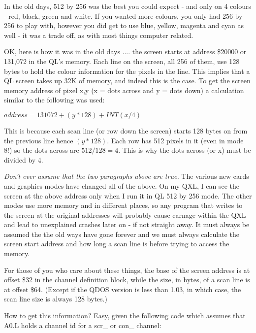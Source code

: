 In the old days, 512 by 256 was the best you could expect -{} and only
    on 4 colours -{} red, black, green and white. If you wanted more colours,
    you only had 256 by 256 to play with, however you did get to use blue,
    yellow, magenta and cyan as well -{} it was a trade off, as with most things
    computer related.

OK, here is how it was in the old days .... the screen starts at
    address \$20000 or 131,072 in the QL's memory. Each line on the screen, all
    256 of them, use 128 bytes to hold the colour information for the pixels
    in the line. This implies that a QL screen takes up 32K of memory, and
    indeed this is the case. To get the screen memory address of pixel x,y (x
    = dots across and y = dots down) a calculation similar to the following
    was used:

$address = 131072 + (y * 128) + INT(x / 4)$

This is because each scan line (or row down the screen) starts 128
    bytes on from the previous line hence $(y * 128)$. Each row has 512 pixels
    in it (even in mode 8!) so the dots across are $512/128 = 4$. This is why
    the dots across (or x) must be divided by 4.

\begin{warning}
\emph{Don't ever assume that the two paragraphs above are
      true.} The various new cards and graphics modes have changed
      all of the above. On my QXL, I can see the screen at the above address
      only when I run it in QL 512 by 256 mode. The other modes use more
      memory and in different places, so any program that writes to the screen
      at the original addresses will probably cause carnage within the QXL and
      lead to unexplained crashes later on -{} if not straight away. It must
      always be assumed the the old ways have gone forever and we must always
      calculate the screen start address and how long a scan line is before
      trying to access the memory.
\end{warning}

For those of you who care about these things, the base of the screen
    address is at offset \$32 in the channel definition block, while the size,
    in bytes, of a scan line is at offset \$64. (Except if the QDOS version is less
    than 1.03, in which case, the scan line size is always 128 bytes.)

How to get this information? Easy, given the following code which
    assumes that A0.L holds a channel id for a scr\_ or con\_ channel:

